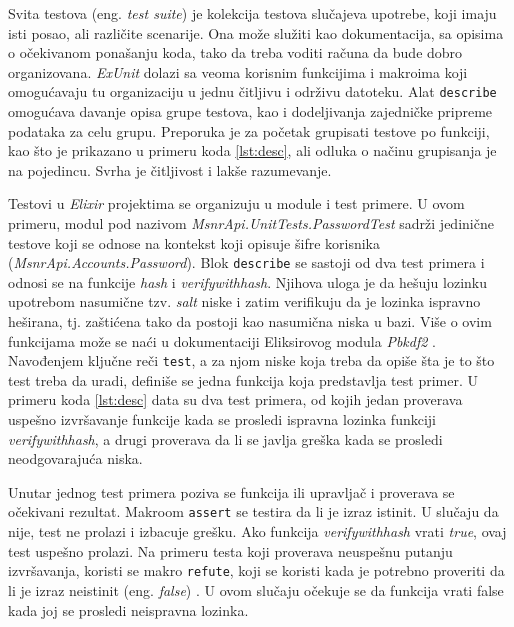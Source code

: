 \documentclass[12pt,oneside]{memoir}
\begin{document}
\par Svita testova (eng. \emph{test suite}) je kolekcija testova slučajeva upotrebe, koji imaju isti posao, ali različite scenarije. Ona može služiti kao dokumentacija, sa opisima o očekivanom ponašanju koda, tako da treba voditi računa da bude dobro organizovana. \emph{ExUnit} dolazi sa veoma korisnim funkcijima i makroima koji omogućavaju tu organizaciju u jednu čitljivu i održivu datoteku. Alat \texttt{describe} omogućava davanje opisa grupe testova, kao i dodeljivanja zajedničke pripreme podataka za celu grupu. Preporuka je za početak grupisati testove po funkciji, kao što je prikazano u primeru koda \ref{lst:desc}, ali odluka o načinu grupisanja je na pojedincu. Svrha je čitljivost i lakše razumevanje.
\par Testovi u \emph{Elixir} projektima se organizuju u module i test primere. U ovom primeru, modul pod nazivom \emph{MsnrApi.UnitTests.PasswordTest} sadrži jedinične testove koji se odnose na kontekst koji opisuje šifre korisnika (\emph{MsnrApi.Accounts.Password}). Blok \texttt{describe} se sastoji od dva test primera i odnosi se na funkcije \emph{hash} i \emph{verify{\textunderscore}with{\textunderscore}hash}. Njihova uloga je da hešuju lozinku upotrebom nasumične tzv. \emph{salt} niske i zatim verifikuju da je lozinka ispravno heširana, tj. zaštićena tako da postoji kao nasumična niska u bazi. Više o ovim funkcijama može se naći u dokumentaciji Eliksirovog modula \emph{Pbkdf2} \cite{pbk}. Navođenjem ključne reči \texttt{test}, a za njom niske koja treba da opiše šta je to što test treba da uradi, definiše se jedna funkcija koja predstavlja test primer. U primeru koda \ref{lst:desc} data su dva test primera, od kojih jedan proverava uspešno izvršavanje funkcije kada se prosledi ispravna lozinka funkciji \emph{verify{\textunderscore}with{\textunderscore}hash}, a drugi proverava da li se javlja greška kada se prosledi neodgovarajuća niska. 
 

\par Unutar jednog test primera poziva se funkcija ili upravljač i proverava se očekivani rezultat. Makroom \texttt{assert} se testira da li je izraz istinit. U slučaju da nije, test ne prolazi i izbacuje grešku. Ako funkcija \emph{verify{\textunderscore}with{\textunderscore}hash} vrati \emph{true}, ovaj test uspešno prolazi. Na primeru testa koji proverava neuspešnu putanju izvršavanja, koristi se makro \texttt{refute}, koji se koristi kada je potrebno proveriti da li je izraz neistinit (eng. \emph{false}) . U ovom slučaju očekuje se da funkcija vrati false kada joj se prosledi neispravna lozinka. \\
\end{document}
